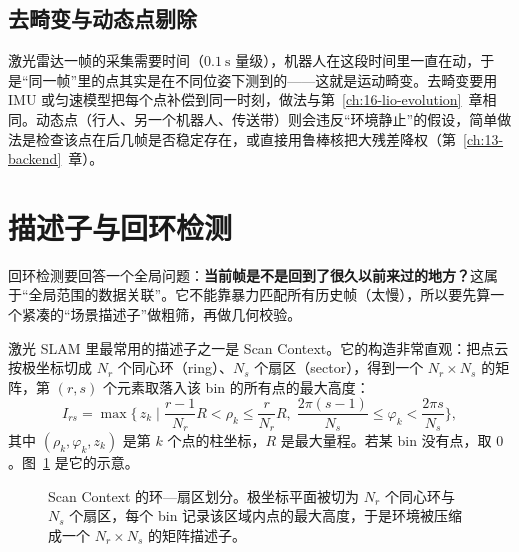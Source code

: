 \subsection{去畸变与动态点剔除}

激光雷达一帧的采集需要时间（$0.1\ \mathrm{s}$ 量级），机器人在这段时间里一直在动，于是``同一帧''里的点其实是在不同位姿下测到的——这就是运动畸变。去畸变要用 IMU 或匀速模型把每个点补偿到同一时刻，做法与第~\ref{ch:16-lio-evolution}~章相同。动态点（行人、另一个机器人、传送带）则会违反``环境静止''的假设，简单做法是检查该点在后几帧是否稳定存在，或直接用鲁棒核把大残差降权（第~\ref{ch:13-backend}~章）。

\section{描述子与回环检测}\label{sec:12-loop}

回环检测要回答一个全局问题：\textbf{当前帧是不是回到了很久以前来过的地方？}这属于``全局范围的数据关联''。它不能靠暴力匹配所有历史帧（太慢），所以要先算一个紧凑的``场景描述子''做粗筛，再做几何校验。

激光 SLAM 里最常用的描述子之一是 Scan Context\cite{kim2018scancontext}。它的构造非常直观：把点云按极坐标切成 $N_r$ 个同心环（ring）、$N_s$ 个扇区（sector），得到一个 $N_r\times N_s$ 的矩阵，第 $(r,s)$ 个元素取落入该 bin 的所有点的最大高度：
\begin{equation}
I_{rs}=\max\Big\{\,z_k \;\Big|\; \frac{r-1}{N_r}R< \rho_k\le\frac{r}{N_r}R,\;
\frac{2\pi(s-1)}{N_s}\le\varphi_k<\frac{2\pi s}{N_s}\Big\},
\label{eq:12-scancontext}
\end{equation}
其中 $(\rho_k,\varphi_k,z_k)$ 是第 $k$ 个点的柱坐标，$R$ 是最大量程。若某 bin 没有点，取 $0$。图~\ref{fig:12-scancontext} 是它的示意。

\begin{figure}[htbp]
  \centering
  \caption{Scan Context 的环—扇区划分。极坐标平面被切为 $N_r$ 个同心环与 $N_s$ 个扇区，每个 bin 记录该区域内点的最大高度，于是环境被压缩成一个 $N_r\times N_s$ 的矩阵描述子。}\label{fig:12-scancontext}
\end{figure}

